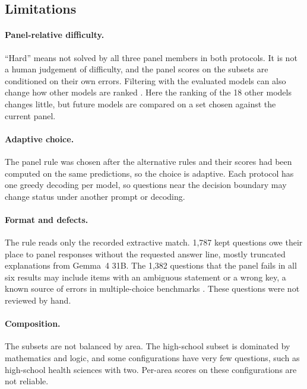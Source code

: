 \subsection{Limitations}
\label{app:hard-limitations}

\paragraph{Panel-relative difficulty.} ``Hard'' means not solved by all three
panel members in both protocols. It is not a human judgement of difficulty,
and the panel scores on the subsets are conditioned on their own errors.
Filtering with the evaluated models can also change how other models are
ranked \citep{phang2022adversarially}. Here the ranking of the 18 other
models changes little, but future models are compared on a set chosen
against the current panel.

\paragraph{Adaptive choice.} The panel rule was chosen after the alternative
rules and their scores had been computed on the same predictions, so the
choice is adaptive. Each protocol has one greedy decoding per model, so
questions near the decision boundary may change status under another prompt
or decoding.

\paragraph{Format and defects.} The rule reads only the recorded extractive
match. 1,787 kept questions owe their place to panel responses without the
requested answer line, mostly truncated explanations from Gemma~4 31B. The
1,382 questions that the panel fails in all six results may include items
with an ambiguous statement or a wrong key, a known source of errors in
multiple-choice benchmarks \citep{gema2025done}. These questions were not
reviewed by hand.

\paragraph{Composition.} The subsets are not balanced by area. The
high-school subset is dominated by mathematics and logic, and some
configurations have very few questions, such as high-school health sciences
with two. Per-area scores on these configurations are not reliable.
